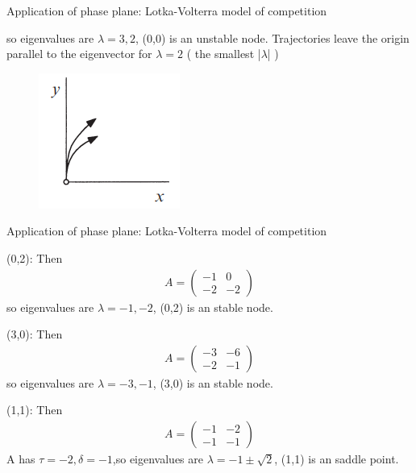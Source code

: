 \documentclass[9pt,aspectratio=43,mathserif,table]{beamer}
\begin{document}
\begin{frame}[label=current]{Application of phase plane: Lotka-Volterra model of competition}
\begin{multicols}{2}
    so eigenvalues are $\lambda = 3,2$, (0,0) is an unstable node. Trajectories leave the origin parallel to the eigenvector for $\lambda = 2$ ( the smallest |$\lambda$| )
    \begin{figure}[!h]
      \centering
      \includegraphics[width=.2\textwidth]{fig/6.4.1.png}
    \end{figure}
  \end{multicols}
\end{frame}

\begin{frame}[label=current]{Application of phase plane: Lotka-Volterra model of competition}
  \begin{multicols}{2}
     (0,2): Then 
    \begin{equation}
      \begin{aligned}
        A = 
        \begin{pmatrix}
           -1 & 0\\
           -2 & -2
        \end{pmatrix}
      \end{aligned}
    \end{equation}
    so eigenvalues are $\lambda = -1,-2$, (0,2) is an stable node.

\medskip

     (3,0): Then 
    \begin{equation}
      \begin{aligned}
        A = 
        \begin{pmatrix}
           -3 & -6\\
           -2 & -1
        \end{pmatrix}
      \end{aligned}
    \end{equation}
    so eigenvalues are $\lambda = -3,-1$, (3,0) is an stable node.

\medskip

     (1,1): Then 
    \begin{equation}
      \begin{aligned}
        A = 
        \begin{pmatrix}
           -1 & -2\\
           -1 & -1
        \end{pmatrix}
      \end{aligned}
    \end{equation}
    A has $\tau = -2, \delta= -1$,so eigenvalues are $\lambda = -1\pm \sqrt 2$, (1,1) is an saddle point.


\end{multicols}
\end{frame}
\end{document}
